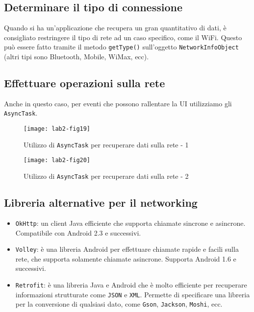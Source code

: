 \subsection{Determinare il tipo di connessione}

Quando si ha un'applicazione che recupera un gran quantitativo di dati, è
consigliato restringere il tipo di rete ad un caso specifico, come il WiFi.
Questo può essere fatto tramite il metodo \texttt{getType()} sull'oggetto
\texttt{NetworkInfoObject} (altri tipi sono Bluetooth, Mobile, WiMax, ecc).

\subsection{Effettuare operazioni sulla rete}

Anche in questo caso, per eventi che possono rallentare la UI utilizziamo gli
\texttt{AsyncTask}.

\begin{figure}[htbp]
        \centering
        \texttt{[image: lab2-fig19]}
        \caption[AsyncTask sulla rete - 1]{Utilizzo di \texttt{AsyncTask} per
recuperare dati sulla rete - 1}
        \label{img:lab2-fig19}
\end{figure}

\begin{figure}[htbp]
        \centering
        \texttt{[image: lab2-fig20]}
        \caption[AsyncTask sulla rete - 2]{Utilizzo di \texttt{AsyncTask} per
recuperare dati sulla rete - 2}
        \label{img:lab2-fig20}
\end{figure}

\subsection{Libreria alternative per il networking}

\begin{itemize}
\item \texttt{OkHttp}: un client Java efficiente che supporta chiamate sincrone
e asincrone. Compatibile con Android 2.3 e successivi.
\item \texttt{Volley}: è una libreria Android per effettuare chiamate rapide e
facili sulla rete, che supporta solamente chiamate asincrone. Supporta Android
1.6 e successivi.
\item \texttt{Retrofit}: è una libreria Java e Android che è molto efficiente
per recuperare informazioni strutturate come \texttt{JSON} e \texttt{XML}.
Permette di specificare una libreria per la conversione di qualsiasi dato, come
\texttt{Gson}, \texttt{Jackson}, \texttt{Moshi}, ecc.
\end{itemize}

